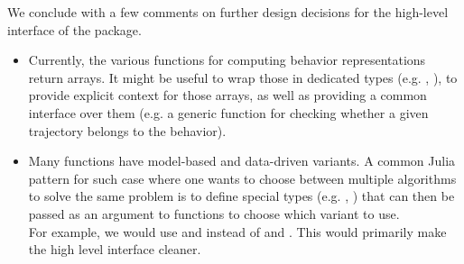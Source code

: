 \documentclass[11pt]{article}
\begin{document}
We conclude with a few comments on further design decisions for the high-level interface of the package.
\begin{itemize}
  \item Currently, the various functions for computing behavior representations return arrays. It might be useful to wrap those in dedicated types (e.g. , ), to provide explicit context for those arrays, as well as providing a common interface over them (e.g. a generic function for checking whether a given trajectory belongs to the behavior).
  \item Many functions have model-based and data-driven variants. A common Julia pattern for such case where one wants to choose between multiple algorithms to solve the same problem is to define special types (e.g. , ) that can then be passed as an argument to functions to choose which variant to use.\\
  For example, we would use  and  instead of  and . This would primarily make the high level interface cleaner.
\end{itemize}

\newpage

\end{document}
